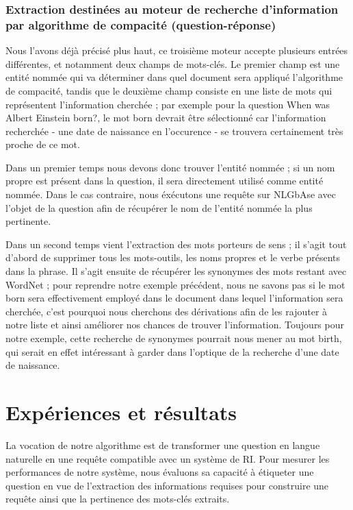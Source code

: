 \documentclass[10pt,a4paper]{article}
\begin{document}
\subsubsection{Extraction destinées au moteur de recherche d'information par algorithme de compacité (question-réponse)}
\par Nous l'avons déjà précisé plus haut, ce troisième moteur accepte plusieurs entrées différentes, et notamment deux champs de mots-clés. Le premier champ est une entité nommée qui va déterminer dans quel document sera appliqué l'algorithme de compacité, tandis que le deuxième champ consiste en une liste de mots qui représentent l'information cherchée ; par exemple pour la question \og{}When was Albert Einstein born?\fg{}, le mot \og{}born\fg{} devrait être sélectionné car l'information recherchée - une date de naissance en l'occurence - se trouvera certainement très proche de ce mot.
\par Dans un premier temps nous devons donc trouver l'entité nommée ; si un nom propre est présent dans la question, il sera directement utilisé comme entité nommée. Dans le cas contraire, nous éxécutons une requête sur NLGbAse avec l'objet de la question afin de récupérer le nom de l'entité nommée la plus pertinente. 
\par Dans un second temps vient l'extraction des mots porteurs de sens ; il s'agit tout d'abord de supprimer tous les mots-outils, les noms propres et le verbe présents dans la phrase. Il s'agit ensuite de récupérer les synonymes des mots restant avec WordNet ; pour reprendre notre exemple précédent, nous ne savons pas si le mot \og{}born\fg{} sera effectivement employé dans le document dans lequel l'information sera cherchée, c'est pourquoi nous cherchons des dérivations afin de les rajouter à notre liste et ainsi améliorer nos chances de trouver l'information. Toujours pour notre exemple, cette recherche de synonymes pourrait nous mener au mot \og{}birth\fg{}, qui serait en effet intéressant à garder dans l'optique de la recherche d'une date de naissance.


\section{Expériences et résultats}\label{experiences}

\par La vocation de notre algorithme est de transformer une question en langue naturelle en une requête compatible avec un système de RI.  Pour mesurer les performances de notre système, nous évaluons sa capacité à étiqueter une question en vue de l'extraction des informations requises pour construire une requête ainsi que la pertinence des mots-clés extraits.
\end{document}
